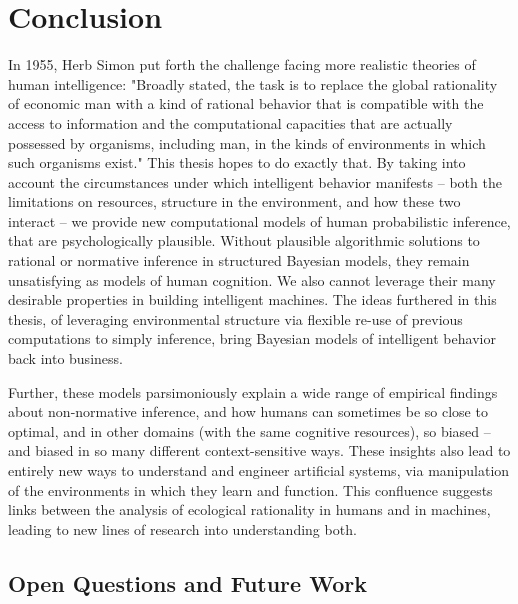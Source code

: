 \chapter{Conclusion}
\label{chap:conclusion}

In 1955, Herb Simon put forth the challenge facing more realistic theories of human intelligence: "Broadly stated, the task is to replace the global rationality of economic man with a kind of rational behavior that is compatible with the access to information and the computational capacities that are actually possessed by organisms, including man, in the kinds of environments in which such organisms exist." This thesis hopes to do exactly that. By taking into account the circumstances under which intelligent behavior manifests -- both the limitations on resources, structure in the environment, and how these two interact -- we provide new computational models of human probabilistic inference, that are psychologically plausible. Without plausible algorithmic solutions to rational or normative inference in structured Bayesian models, they remain unsatisfying as models of human cognition. We also cannot leverage their many desirable properties in building intelligent machines. The ideas furthered in this thesis, of leveraging environmental structure via flexible re-use of previous computations to simply inference, bring Bayesian models of intelligent behavior back into business.

Further, these models parsimoniously explain a wide range of empirical findings about non-normative inference, and how humans can sometimes be so close to optimal, and in other domains (with the same cognitive resources), so biased -- and biased in so many different context-sensitive ways. These insights also lead to entirely new ways to understand and engineer artificial systems, via manipulation of the environments in which they learn and function. This confluence suggests links between the analysis of ecological rationality in humans and in machines, leading to new lines of research into understanding both.

\section*{Open Questions and Future Work}

